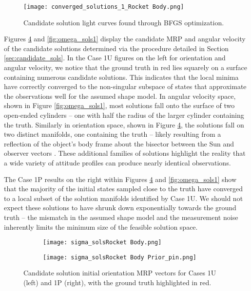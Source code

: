 \documentclass[a4paper,twocolumn]{spaceDebrisC} %
\newcommand{\figmed}[0]{0.35\textwidth}
\begin{document}
\begin{figure}[H]
  \centering
  \texttt{[image: converged\_solutions\_1\_Rocket Body.png]}
  \caption{Candidate solution light curves found through BFGS optimization.}
  \label{fig:conv_lcs_synth}
\end{figure}

Figures \ref{fig:sigma_sols1} and \ref{fig:omega_sols1} display the candidate MRP and angular velocity of the candidate solutions determined via the procedure detailed in Section \ref{sec:candidate_sols}. In the Case 1U figures on the left for orientation and angular velocity, we notice that the ground truth in red lies squarely on a surface containing numerous candidate solutions. This indicates that the local minima have correctly converged to the non-singular subspace of states that approximate the observations well for the assumed shape model. In angular velocity space, shown in Figure \ref{fig:omega_sols1}, most solutions fall onto the surface of two open-ended cylinders -- one with half the radius of the larger cylinder containing the truth. Similarly in orientation space, shown in Figure \ref{fig:sigma_sols1}, the solutions fall on two distinct manifolds, one containing the truth -- likely resulting from a reflection of the object's body frame about the bisector between the Sun and observer vectors \cite{marto2024, burton2024journal}. These additional families of solutions highlight the reality that a wide variety of attitude profiles can produce nearly identical observations.

The Case 1P results on the right within Figures \ref{fig:sigma_sols1} and \ref{fig:omega_sols1} show that the majority of the initial states sampled close to the truth have converged to a local subset of the solution manifolds identified by Case 1U. We should not expect these solutions to have shrunk down exponentially towards the ground truth -- the mismatch in the assumed shape model and the measurement noise inherently limits the minimum size of the feasible solution space.

\begin{figure}[H]
  \centering
  \begin{subfigure}[t]{0.23\textwidth}
    \centering
    \texttt{[image: sigma\_solsRocket Body.png]}
    \caption{}
    \label{fig:sigma_sols1U}
  \end{subfigure}
  \hfill
  \begin{subfigure}[t]{0.23\textwidth}
    \centering
    \texttt{[image: sigma\_solsRocket Body Prior\_pin.png]}
    \caption{}
    \label{fig:sigma_sols1P}
  \end{subfigure}

  \caption{Candidate solution initial orientation MRP vectors for Cases 1U (left) and 1P (right), with the ground truth highlighted in red.}
  \label{fig:sigma_sols1}
\end{figure}
\end{document}
